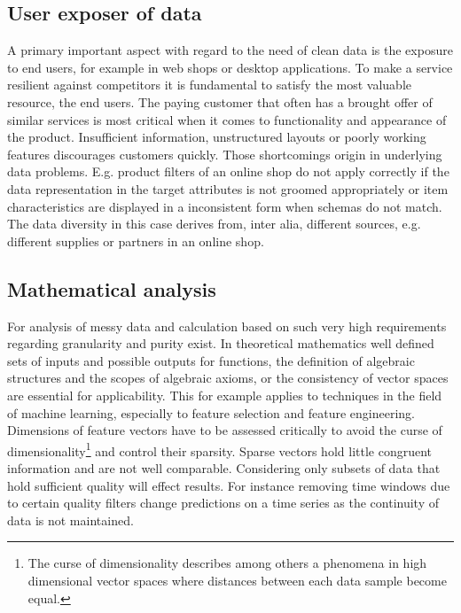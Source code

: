 \subsection{User exposer of data}

A primary important aspect with regard to the need of clean data is the exposure to end users, for example in web shops or desktop applications\cite{kim_niehm_2009}. To make a service resilient against competitors it is fundamental to satisfy the most valuable resource, the end users. The paying customer that often has a brought offer of similar services is most critical when it comes to functionality and appearance of the product\cite{huitfeldt_middleton_2001}. Insufficient information, unstructured layouts or poorly working features discourages customers quickly. Those shortcomings origin in underlying data problems. E.g. product filters of an online shop do not apply correctly if the data representation in the target attributes is not groomed appropriately or item characteristics are displayed in a inconsistent form when schemas do not match. The data diversity in this case derives from, inter alia, different sources, e.g. different supplies or partners in an online shop.

\subsection{Mathematical analysis} 

For analysis of messy data and calculation based on such 
very high requirements regarding granularity and purity exist. In theoretical mathematics well defined sets of inputs and possible outputs for functions, the definition of algebraic structures and the scopes of algebraic axioms, or the consistency of vector spaces are essential for applicability. This for example applies to techniques in the field of machine learning, especially to feature selection and feature engineering\cite{mitchell_1999}. Dimensions of feature vectors have to be assessed critically to avoid the curse of dimensionality\footnote{The curse of dimensionality describes among others a phenomena in high dimensional vector spaces where distances between each data sample become equal.} and control their sparsity. Sparse vectors hold little congruent information and are not well comparable. Considering only subsets of data that hold sufficient quality will effect results. For instance removing time windows due to certain quality filters change predictions on a time series as the continuity of data is not maintained.

